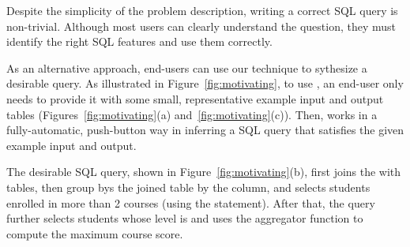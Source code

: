 Despite the simplicity of the problem description,
writing a correct SQL query is non-trivial.
Although most users can clearly understand the
question, they must identify the right SQL
features and use them correctly.

As an alternative approach, end-users can use
our \ourtool technique to sythesize a desirable query.
As illustrated in Figure~\ref{fig:motivating},
to use \ourtool, an end-user only needs to provide it with
some small, representative example input and output tables
(Figures~\ref{fig:motivating}(a) and~\ref{fig:motivating}(c)).
Then, \ourtool works in a fully-automatic, push-button
way in inferring a SQL query that satisfies the given
example input and output.


The desirable SQL query, shown in Figure~\ref{fig:motivating}(b),
first joins the  with  tables,
then group bys the joined table by the 
column, and selects students enrolled in more
than 2 courses (using the  statement).
After that, the query further selects students
whose level is  and uses the 
aggregator function to compute the maximum course score.






